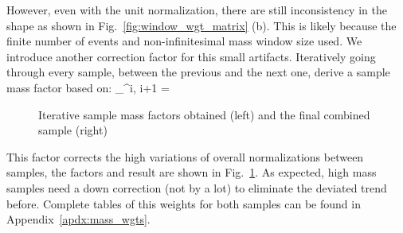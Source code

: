 However, even with the unit normalization, there are still inconsistency in the shape as shown
in Fig.~\ref{fig:window_wgt_matrix} (b). This is likely because the finite number of events
and non-infinitesimal mass window size used. We introduce another correction factor for
this small artifacts. Iteratively going through every sample, between the previous and the
next one, derive a sample mass factor based on:
\be
{}_^{i, i+1} = 
\ee

\begin{figure}[htb]
    \begin{center}
    \end{center}
    \caption{Iterative sample mass factors obtained (left) and the final combined sample (right)}
    \label{fig:LHE_rewgt}
\end{figure}

This factor corrects the high variations of overall normalizations between samples, the factors and result
are shown in Fig.~\ref{fig:LHE_rewgt}. As expected, high mass samples need a down correction (not by a lot)
to eliminate the deviated trend before. Complete tables of this weights for both samples can be found
in Appendix~\ref{apdx:mass_wgts}.

